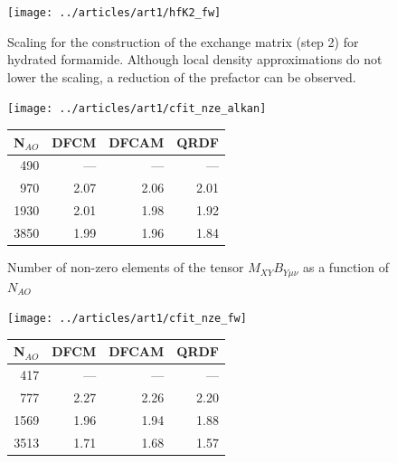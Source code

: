 \begin{figure}
\centering
\texttt{[image: ../articles/art1/hfK2\_fw]}
\label{fig:GS_DFK2SCALE_FW}
\caption{Scaling for the construction of the exchange matrix (step 2) for hydrated formamide. Although local density approximations do not lower the scaling, a reduction of the prefactor can be observed.}
\end{figure}


%
\begin{figure}
\begin{minipage}{0.5\textwidth}
\texttt{[image: ../articles/art1/cfit\_nze\_alkan]}
\end{minipage}
\begin{minipage}{0.3\textwidth}
\begin{tabular}{rrrr}
\hline
N$_{AO}$ & DFCM & DFCAM & QRDF \\ \hline
490 & --- & --- & --- \\ 
970 & 2.07 & 2.06 & 2.01 \\ 
1930 & 2.01 & 1.98 & 1.92 \\ 
3850 & 1.99 & 1.96 & 1.84 \\ \hline
\end{tabular}
\end{minipage}
\caption{Number of non-zero elements of the tensor $M_{XY}B_{Y\mu\nu}$ as a function of $N_{AO}$ }
\label{fig:GS_MBNZE_LA}
\end{figure}
%
\begin{figure}
\begin{minipage}{0.5\textwidth}
\texttt{[image: ../articles/art1/cfit\_nze\_fw]}
\end{minipage}
\hspace{0.05\textwidth}
\begin{minipage}{0.3\textwidth}
\begin{tabular}{rrrr}
\hline
N$_{AO}$ & DFCM & DFCAM & QRDF \\ \hline
417 & --- & --- & --- \\ 
777 & 2.27 & 2.26 & 2.20 \\ 
1569 & 1.96 & 1.94 & 1.88 \\ 
3513 & 1.71 & 1.68 & 1.57 \\ \hline
\end{tabular}
\end{minipage}
\end{figure}
%

